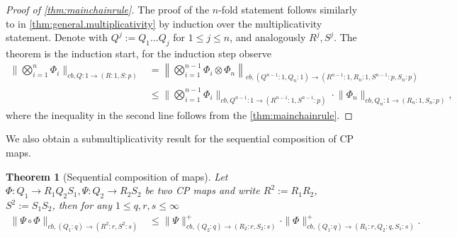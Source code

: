 \documentclass[11pt]{article}
\DeclareMathOperator{\id}{id}
\newcommand{\1}{\ensuremath{\mathbbm{1}}}
\theoremstyle{newdefinition}
\theoremstyle{newplain}
\newtheorem{theorem}[definition]{Theorem}
\theoremstyle{myplain}
\begin{document}
\begin{proof}[Proof of \cref{thm:mainchainrule}]

The proof of the $n$-fold statement follows similarly to in \cref{thm:general.multiplicativity} by induction over the multiplicativity statement.
Denote with $Q^j:=Q_1...Q_j$ for $1\leq j\leq n$, and analogously $R^j,S^j$. The theorem is the induction start, for the induction step observe
\begin{align}
    \bigg\|\bigotimes^n_{i=1}\Phi_i\bigg\|_{cb,Q:1\to (R:1,S:p)} &= \left\|\bigotimes^{n-1}_{i=1}\Phi_i\otimes\Phi_n\right\|_{cb,({Q^{n-1}:1},{Q_n}:1)\to (R^{n-1}:1,{R_n}:1,S^{n-1}:p,S_n:p)} \\ &\leq \bigg\|\bigotimes^{n-1}_{i=1}\Phi_i\bigg\|_{cb,Q^{n-1}:1\to (R^{n-1}:1,S^{n-1}:p)}\cdot\big\|\Phi_n\big\|_{cb,Q_n:1\to (R_n:1,S_n:p)}, 
\end{align} where the inequality in the second line follows from the \cref{thm:mainchainrule}.
\end{proof}

We also obtain a submultiplicativity result for the sequential composition of CP maps.
\begin{theorem}[Sequential composition of maps]\label{thm:Sequential.chain.rule}
Let $\Phi:Q_1\to R_1Q_2S_1, \Psi:Q_2\to R_2S_2$ be two CP maps and write $R^2:=R_1R_2$, $S^2:=S_1S_2$, then for any $1\leq q,r,s\leq\infty$
    \begin{align}
\|\Psi\circ\Phi\|_{cb,(Q_1:q)\to(R^2:r,S^2:s)} &\leq \|\Psi\|^{+}_{cb,(Q_2:q)\to(R_2:r,S_2:s)} \cdot \|\Phi\|^{+}_{cb,(Q_1:q)\to(R_1:r,Q_2:q,S_1:s)}.
    \end{align} 
\end{theorem}
\end{document}

